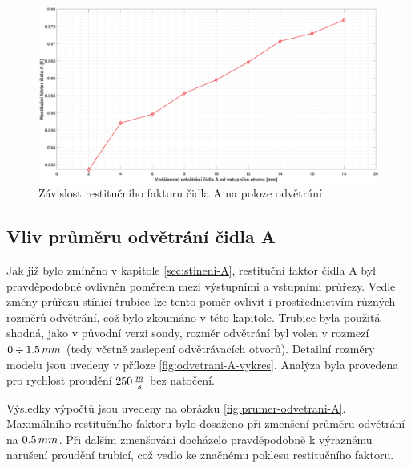           \begin{figure}[ht!]
            \centering
            \includegraphics*[width=\textwidth]{400_SIMULACE_KONSTRUKCNICH_UPRAV/Grafy/06_poloha_odvetrani_A.eps}
            \caption{Závislost restitučního faktoru čidla A na poloze odvětrání}
            \label{fig:poloha-odvetrani-A}
        \end{figure}
    
    \newpage
    \subsection{Vliv průměru odvětrání čidla A} \label{sec:prumer-odvetrani}
        Jak již bylo zmíněno v kapitole \ref{sec:stineni-A}, restituční faktor čidla A byl pravděpodobně ovlivněn poměrem mezi výstupními a vstupními průřezy. Vedle změny průřezu stínící trubice lze tento poměr ovlivit i prostřednictvím různých rozměrů odvětrání, což bylo zkoumáno v této kapitole. Trubice byla použitá shodná, jako v původní verzi sondy, rozměr odvětrání byl volen v rozmezí $0 \div 1.5 \, mm$ (tedy včetně zaslepení odvětrávacích otvorů). Detailní rozměry modelu jsou uvedeny v příloze \ref{fig:odvetrani-A-vykres}. Analýza byla provedena pro rychlost proudění $250 \, \frac{m}{s}$ bez natočení.

        Výsledky výpočtů jsou uvedeny na obrázku \ref{fig:prumer-odvetrani-A}. Maximálního restitučního faktoru bylo dosaženo při zmenšení průměru odvětrání na $0.5 \, mm$. Při dalším zmenšování docházelo pravděpodobně k výraznému narušení proudění trubicí, což vedlo ke značnému poklesu restitučního faktoru.
        
